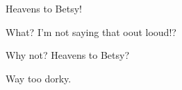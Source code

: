 

Heavens to Betsy!

What?  I'm not saying that oout looud!?

Why not?  Heavens to Betsy?

Way too dorky.

\bye
